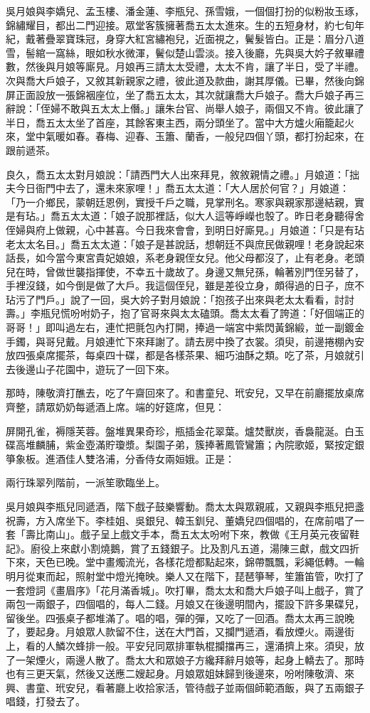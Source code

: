吳月娘與李嬌兒、孟玉樓、潘金蓮、李瓶兒、孫雪娥，一個個打扮的似粉妝玉琢，錦繡耀目，都出二門迎接。眾堂客簇擁著喬五太太進來。生的五短身材，約七旬年紀，戴著疊翠寶珠冠，身穿大紅宮繡袍兒，近面視之，鬢髮皆白。正是：眉分八道雪，髻綰一窩絲，眼如秋水微渾，鬢似楚山雲淡。接入後廳，先與吳大妗子敘畢禮數，然後與月娘等廝見。月娘再三請太太受禮，太太不肯，讓了半日，受了半禮。次與喬大戶娘子，又敘其新親家之禮，彼此道及款曲，謝其厚儀。已畢，然後向錦屏正面設放一張錦裀座位，坐了喬五太太，其次就讓喬大戶娘子。喬大戶娘子再三辭說：「侄婦不敢與五太太上僭。」讓朱台官、尚舉人娘子，兩個又不肯。彼此讓了半日，喬五太太坐了首座，其餘客東主西，兩分頭坐了。當中大方爐火廂籠起火來，堂中氣暖如春。春梅、迎春、玉簫、蘭香，一般兒四個丫頭，都打扮起來，在跟前遞茶。

良久，喬五太太對月娘說：「請西門大人出來拜見，敘敘親情之禮。」月娘道：「拙夫今日衙門中去了，還未來家哩！」喬五太太道：「大人居於何官？」月娘道： 「乃一介鄉民，蒙朝廷恩例，實授千戶之職，見掌刑名。寒家與親家那邊結親，實是有玷。」喬五太太道：「娘子說那裡話，似大人這等崢嶸也彀了。昨日老身聽得舍侄婦與府上做親，心中甚喜。今日我來會會，到明日好廝見。」月娘道：「只是有玷老太太名目。」喬五太太道：「娘子是甚說話，想朝廷不與庶民做親哩！老身說起來話長，如今當今東宮貴妃娘娘，系老身親侄女兒。他父母都沒了，止有老身。老頭兒在時，曾做世襲指揮使，不幸五十歲故了。身邊又無兒孫，輪著別門侄另替了，手裡沒錢，如今倒是做了大戶。我這個侄兒，雖是差役立身，頗得過的日子，庶不玷污了門戶。」說了一回，吳大妗子對月娘說：「抱孩子出來與老太太看看，討討壽。」李瓶兒慌吩咐奶子，抱了官哥來與太太磕頭。喬太太看了誇道：「好個端正的哥哥！」即叫過左右，連忙把氈包內打開，捧過一端宮中紫閃黃錦緞，並一副鍍金手鐲，與哥兒戴。月娘連忙下來拜謝了。請去房中換了衣裳。須臾，前邊捲棚內安放四張桌席擺茶，每桌四十碟，都是各樣茶果、細巧油酥之類。吃了茶，月娘就引去後邊山子花園中，遊玩了一回下來。

那時，陳敬濟打醮去，吃了午齋回來了。和書童兒、玳安兒，又早在前廳擺放桌席齊整，請眾奶奶每遞酒上席。端的好筵席，但見：

屏開孔雀，褥隱芙蓉。盤堆異果奇珍，瓶插金花翠葉。爐焚獸炭，香裊龍涎。白玉碟高堆麟脯，紫金壺滿貯瓊漿。梨園子弟，簇捧著鳳管鸞簫；內院歌姬，緊按定銀箏象板。進酒佳人雙洛浦，分香侍女兩姮娥。正是：

兩行珠翠列階前，一派笙歌臨坐上。

吳月娘與李瓶兒同遞酒，階下戲子鼓樂響動。喬太太與眾親戚，又親與李瓶兒把盞祝壽，方入席坐下。李桂姐、吳銀兒、韓玉釧兒、董嬌兒四個唱的，在席前唱了一套「壽比南山」。戲子呈上戲文手本，喬五太太吩咐下來，教做《王月英元夜留鞋記》。廚役上來獻小割燒鵝，賞了五錢銀子。比及割凡五道，湯陳三獻，戲文四折下來，天色已晚。堂中畫燭流光，各樣花燈都點起來，錦帶飄飄，彩繩低轉。一輪明月從東而起，照射堂中燈光掩映。樂人又在階下，琵琶箏琴，笙簫笛管，吹打了一套燈詞《畫眉序》「花月滿香城」。吹打畢，喬太太和喬大戶娘子叫上戲子，賞了兩包一兩銀子，四個唱的，每人二錢。月娘又在後邊明間內，擺設下許多果碟兒，留後坐。四張桌子都堆滿了。唱的唱，彈的彈，又吃了一回酒。喬太太再三說晚了，要起身。月娘眾人款留不住，送在大門首，又攔門遞酒，看放煙火。兩邊街上，看的人鱗次蜂排一般。平安兒同眾排軍執棍攔擋再三，還涌擠上來。須臾，放了一架煙火，兩邊人散了。喬太大和眾娘子方纔拜辭月娘等，起身上轎去了。那時也有三更天氣，然後又送應二嫂起身。月娘眾姐妹歸到後邊來，吩咐陳敬濟、來興、書童、玳安兒，看著廳上收拾家活，管待戲子並兩個師範酒飯，與了五兩銀子唱錢，打發去了。

